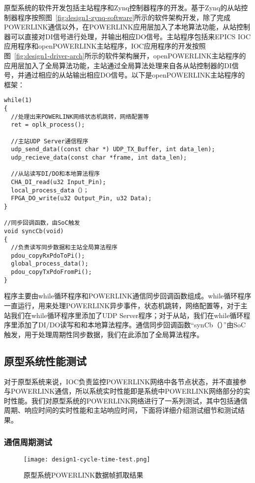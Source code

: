 原型系统的软件开发包括主站程序和Zynq控制器程序的开发。基于Zynq的从站控制器程序按照图~\ref{fig:design1-zynq-software}所示的软件架构开发，除了完成POWERLINK通信以外，在POWERLINK应用层加入了本地算法功能，从站控制器可以直接对DI信号进行处理，并输出相应DO信号。主站程序包括来EPICS IOC应用程序和openPOWERLINK主站程序，IOC应用程序的开发按照图~\ref{fig:design1-driver-arch}所示的软件架构展开，openPOWERLINK主站程序的应用层加入了全局算法功能，主站通过全局算法处理来自各从站控制器的DI信号，并通过相应的从站输出相应DO信号。以下是openPOWERLINK主站程序的框架：
\begin{lstlisting}
while(1)
{ 
  //处理出来POWERLINK网络状态机跳转，网络配置等
  ret = oplk_process();

  //主站UDP Server通信程序
  udp_send_data((const char *) UDP_TX_Buffer, int data_len);
  udp_recieve_data(const char *frame, int data_len);

  //从站读写DI/DO和本地算法程序
  CHA_DI_read(u32 Input_Pin);
  local_process_data（）；
  FPGA_DO_write(u32 Output_Pin, u32 Data);
}

//同步回调函数，由SoC触发
void syncCb(void)
{
  //负责读写同步数据和主站全局算法程序
  pdou_copyRxPdoToPi();
  global_process_data();
  pdou_copyTxPdoFromPi();
}
\end{lstlisting}

程序主要由while循环程序和POWERLINK通信同步回调函数组成。while循环程序一直运行，用来处理POWERLINK异步事件，状态机跳转，网络配置等，对于主站我们在while循环程序里添加了UDP Server程序；对于从站，我们在while循环程序里添加了DI/DO读写和和本地算法程序。通信同步回调函数“synCb（）”由SoC触发，用于处理周期性同步数据，我们在此添加了全局算法程序。


\subsection{原型系统性能测试}

\label{section:原型系统性能测试}

对于原型系统来说，IOC负责监控POWERLINK网络中各节点状态，并不直接参与POWERLINK通信，所以系统实时性能即是系统中POWERLINK网络部分的实时性能。我们对原型系统的POWERLINK网络进行了一系列测试，其中包括通信周期、响应时间的实时性能和主站响应时间，下面将详细介绍测试细节和测试结果。

\subsubsection{通信周期测试}

\begin{figure}[!htb]
  \centering
  \texttt{[image: design1-cycle-time-test.png]}
  \caption{原型系统POWERLINK数据帧抓取结果}
  \label{fig:design1-cycle-time-test}
\end{figure}

